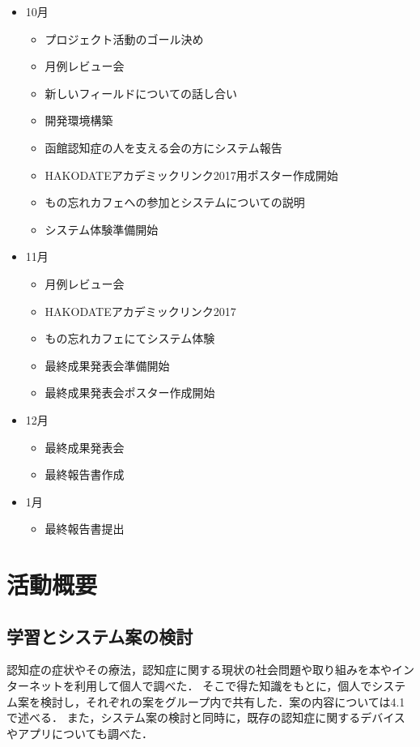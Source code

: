 \documentclass[../report]{subfiles}
\begin{document}
\begin{itemize}
\begin{itemize}
    \end{itemize}
  \item[] 10月
    \begin{itemize}
      \item プロジェクト活動のゴール決め
      \item 月例レビュー会
      \item 新しいフィールドについての話し合い
      \item 開発環境構築
      \item 函館認知症の人を支える会の方にシステム報告
      \item HAKODATEアカデミックリンク2017用ポスター作成開始
      \item もの忘れカフェへの参加とシステムについての説明
      \item システム体験準備開始
    \end{itemize}
  \item[] 11月
    \begin{itemize}
      \item 月例レビュー会
      \item HAKODATEアカデミックリンク2017
      \item もの忘れカフェにてシステム体験
      \item 最終成果発表会準備開始
      \item 最終成果発表会ポスター作成開始
    \end{itemize}
  \item[] 12月
    \begin{itemize}
      \item 最終成果発表会
      \item 最終報告書作成
    \end{itemize}
  \item[] 1月
    \begin{itemize}
      \item 最終報告書提出
    \end{itemize}
\end{itemize}


\section{活動概要}
\subsection{学習とシステム案の検討} \label{sec:discuss}
認知症の症状やその療法，認知症に関する現状の社会問題や取り組みを本やインターネットを利用して個人で調べた．
そこで得た知識をもとに，個人でシステム案を検討し，それぞれの案をグループ内で共有した．案の内容については4.1 で述べる．
また，システム案の検討と同時に，既存の認知症に関するデバイスやアプリについても調べた．
\end{document}
